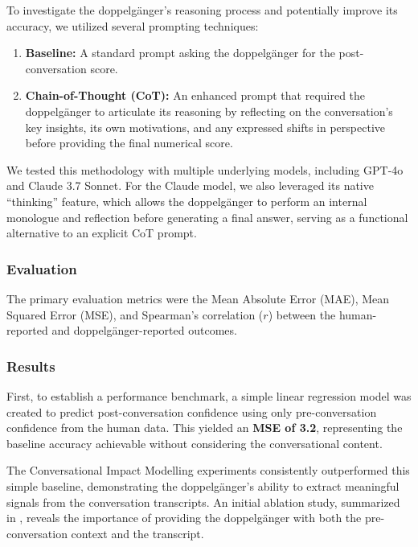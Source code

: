 To investigate the doppelgänger's reasoning process and potentially improve its
accuracy, we utilized several prompting techniques:

\begin{enumerate}
	\item \textbf{Baseline:} A standard prompt asking the doppelgänger for the post-conversation score.
	\item \textbf{Chain-of-Thought (CoT):} An enhanced prompt that required the doppelgänger to articulate its reasoning by reflecting on the conversation's key insights, its own motivations, and any expressed shifts in perspective before providing the final numerical score.
\end{enumerate}

We tested this methodology with multiple underlying models, including GPT-4o and Claude
3.7 Sonnet. For the Claude model, we also leveraged its native ``thinking'' feature,
which allows the doppelgänger to perform an internal monologue and reflection before
generating a final answer, serving as a functional alternative to an explicit CoT
prompt.

\subsubsection{Evaluation}
The primary evaluation metrics were the Mean Absolute Error (MAE), Mean Squared Error
(MSE), and Spearman's correlation ($r$) between the human-reported and
doppelgänger-reported outcomes.

\subsubsection{Results}
First, to establish a performance benchmark, a simple linear regression model was
created to predict post-conversation confidence using only pre-conversation confidence
from the human data. This yielded an \textbf{MSE of 3.2}, representing the baseline
accuracy achievable without considering the conversational content.

The Conversational Impact Modelling experiments consistently outperformed this simple
baseline, demonstrating the doppelgänger's ability to extract meaningful signals from
the conversation transcripts. An initial ablation study, summarized in
, reveals the importance of providing the doppelgänger with
both the pre-conversation context and the transcript.

